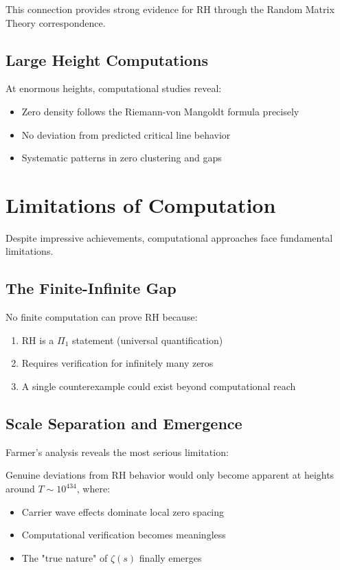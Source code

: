 This connection provides strong evidence for RH through the Random Matrix Theory correspondence.

\subsection{Large Height Computations}

At enormous heights, computational studies reveal:

\begin{itemize}
\item Zero density follows the Riemann-von Mangoldt formula precisely
\item No deviation from predicted critical line behavior
\item Systematic patterns in zero clustering and gaps
\end{itemize}

\section{Limitations of Computation}
\label{sec:computational-limits}

Despite impressive achievements, computational approaches face fundamental limitations.

\subsection{The Finite-Infinite Gap}

\begin{theorem}
No finite computation can prove RH because:
\begin{enumerate}
\item RH is a $\Pi_1$ statement (universal quantification)
\item Requires verification for infinitely many zeros
\item A single counterexample could exist beyond computational reach
\end{enumerate}
\end{theorem}

\subsection{Scale Separation and Emergence}

Farmer's analysis reveals the most serious limitation:

\begin{problem}
Genuine deviations from RH behavior would only become apparent at heights around $T \sim 10^{434}$, where:
\begin{itemize}
\item Carrier wave effects dominate local zero spacing
\item Computational verification becomes meaningless
\item The "true nature" of $\zeta(s)$ finally emerges
\end{itemize}
\end{problem}

